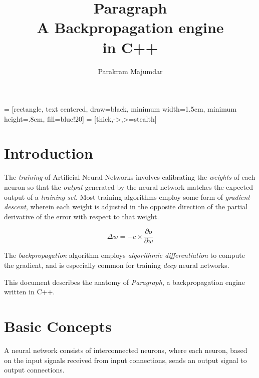 \documentclass{article}
\title{
                         Paragraph                    \\
  \large          A Backpropagation engine            \\ 
                          in C++
}
\author{Parakram Majumdar}
\begin{document}
  \maketitle
  
 = [rectangle,
                      text centered,
                      draw=black,
                      minimum width=1.5cm,
                      minimum height=.8cm,
                      fill=blue!20]
 = [thick,->,>=stealth]

\section{Introduction}
  The \emph{training} of Artificial Neural Networks
  involves calibrating the \emph{weights} of each neuron
  so that the \emph{output} generated by the neural network 
  matches the expected output of a \emph{training set}. 
  Most training algorithms employ some form of \emph{gradient descent},
  wherein each weight is adjusted in the opposite direction of
  the partial derivative of the error with respect to that weight.
  
  \[ \Delta w = -c \times \frac{\partial o}{\partial w} \]
  
  The \emph{backpropagation} algorithm employs \emph{algorithmic differentiation}
  to compute the gradient, and is especially common for training
  \emph{deep} neural networks.
  
  This document describes the anatomy of \emph{Paragraph},
  a backpropagation engine written in C++.
  
\section{Basic Concepts}
  A neural network consists of interconnected neurons, where each neuron,
  based on the input signals received from input connections,
  sends an output signal to output connections.
  
  \begin{center}
  \end{center}
  
\end{document}
